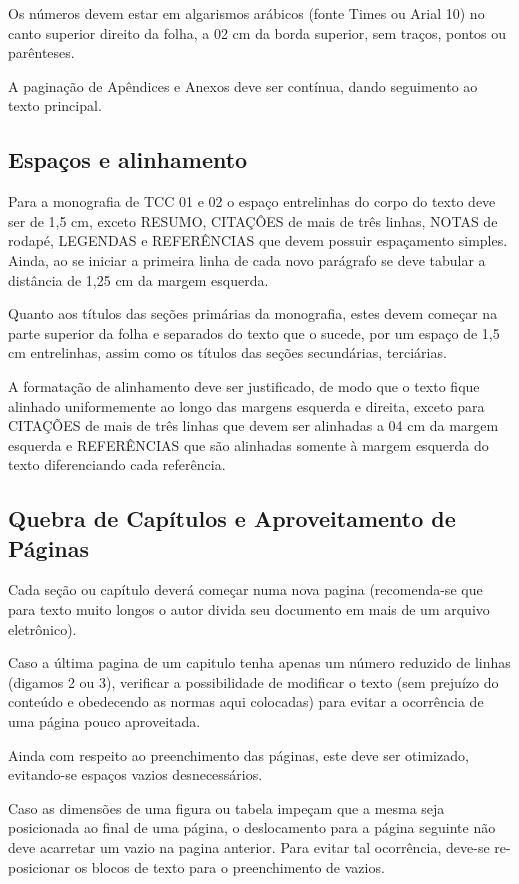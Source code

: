 Os números devem estar em algarismos arábicos (fonte Times ou Arial 10) no
canto superior direito da folha, a 02 cm da borda superior, sem traços,
pontos ou parênteses.

A paginação de Apêndices e Anexos deve ser contínua, dando seguimento ao
texto principal.

\subsection{Espaços e alinhamento}

Para a monografia de TCC 01 e 02 o espaço entrelinhas do corpo do texto
deve ser de 1,5 cm, exceto RESUMO, CITAÇÔES de mais de três linhas, NOTAS
de rodapé, LEGENDAS e REFERÊNCIAS que devem possuir espaçamento simples.
Ainda, ao se iniciar a primeira linha de cada novo parágrafo se deve
tabular a distância de 1,25 cm da margem esquerda.

Quanto aos títulos das seções primárias da monografia, estes devem começar
na parte superior da folha e separados do texto que o sucede, por um espaço
de 1,5 cm entrelinhas, assim como os títulos das seções secundárias,
terciárias.

A formatação de alinhamento deve ser justificado, de modo que o texto fique
alinhado uniformemente ao longo das margens esquerda e direita, exceto para
CITAÇÕES de mais de três linhas que devem ser alinhadas a 04 cm da margem
esquerda e REFERÊNCIAS que são alinhadas somente à margem esquerda do texto
diferenciando cada referência.

\subsection{Quebra de Capítulos e Aproveitamento de Páginas}

Cada seção ou capítulo deverá começar numa nova pagina (recomenda-se que
para texto muito longos o autor divida seu documento em mais de um arquivo
eletrônico).

Caso a última pagina de um capitulo tenha apenas um número reduzido de
linhas (digamos 2 ou 3), verificar a possibilidade de modificar o texto
(sem prejuízo do conteúdo e obedecendo as normas aqui colocadas) para
evitar a ocorrência de uma página pouco aproveitada.

Ainda com respeito ao preenchimento das páginas, este deve ser otimizado,
evitando-se espaços vazios desnecessários.

Caso as dimensões de uma figura ou tabela impeçam que a mesma seja
posicionada ao final de uma página, o deslocamento para a página seguinte
não deve acarretar um vazio na pagina anterior. Para evitar tal ocorrência,
deve-se re-posicionar os blocos de texto para o preenchimento de vazios.

